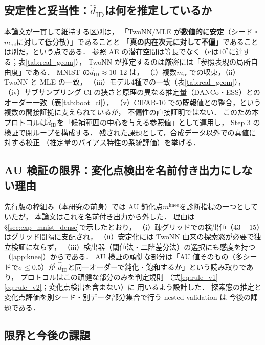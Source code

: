 \documentclass[11pt,a4paper]{jsarticle}
\newcommand{\hatdID}{\hat{d}_{\mathrm{ID}}}
\newcommand{\kap}{\kappa}
\newcommand{\mknee}{m^{\mathrm{knee}}}
\begin{document}
\subsection{安定性と妥当性：$\hatdID$は何を推定しているか}\label{sec:disc_twonn}

本論文が一貫して維持する区別は，
「TwoNN/MLE が\textbf{数値的に安定}（シード・$m_{\mathrm{ref}}$に対して低分散）」であることと
「\textbf{真の内在次元に対して不偏}」であることは別だ，という点である．
参照 AE の潜在空間は等長でなく（$\kap$は$10^{7}$に達する；表\ref{tab:real_geom}），
TwoNN が推定するのは厳密には「参照表現の局所自由度」である．
MNIST の$\hatdID \approx 10$--12 は，
（i）複数$m_{\mathrm{ref}}$での収束，（ii）TwoNN と MLE の一致，
（iii）モデル4種での一致（表\ref{tab:real_geom}），
（iv）サブサンプリング CI の狭さと原理の異なる推定量（DANCo・ESS）との
オーダー一致（表\ref{tab:boot_ci}），
（v）CIFAR-10 での既報値との整合，という複数の間接証拠に支えられているが，
不偏性の直接証明ではない．
このため本プロトコルは$\hatdID$を「候補範囲の中心を与える参照値」として運用し，
Step 3 の検証で閉ループを構成する．
残された課題として，合成データ以外での真値に対する校正
（推定量のバイアス特性の系統評価）を挙げる．

\subsection{AU 検証の限界：変化点検出を名前付き出力にしない理由}\label{sec:disc_knee}

先行版の枠組み（本研究の前身）では AU 鈍化点$\mknee$を診断指標の一つとしていたが，
本論文はこれを名前付き出力から外した．
理由は§\ref{sec:exp_mnist_dense}で示したとおり，
（i）疎グリッドでの検出値（$43 \pm 15$）はグリッド間隔に支配され，
（ii）安定化には TwoNN 由来の探索窓が必要で独立検証にならず，
（iii）検出器（閾値法・二階差分法）の選択にも感度を持つ（\ref{app:knee}）からである．
AU 検証の頑健な部分は「AU 値そのもの（多シードで$\sigma \leq 0.5$）が
$\hatdID$と同一オーダーで鈍化・飽和するか」という読み取りであり，
プロトコルはこの頑健な部分のみを判定規則
（式\eqref{eq:rule_v1}--\eqref{eq:rule_v2}；変化点検出を含まない）に
用いるよう設計した．
探索窓の推定と変化点評価を別シード・別データ部分集合で行う nested validation は
今後の課題である．

\subsection{限界と今後の課題}\label{sec:disc_limitation}
\end{document}
